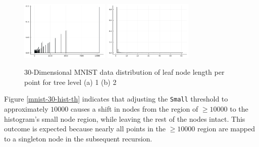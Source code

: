 \documentclass{juliacon}
\begin{document}
\begin{figure}[!ht]
  \centerline{
    \includegraphics[width=10pc]{figures/experiments/mnist_30/hist_1.png}
    \includegraphics[width=10pc]{figures/experiments/mnist_30/hist_2.png}
  }

  \caption{
    30-Dimensional MNIST data distribution of leaf node length per point for
    tree level (a) 1 (b) 2
  }
  \label{mnist-30-hist}
\end{figure}

Figure \ref{mnist-30-hist-th} indicates that adjusting the \verb|Small|
threshold to approximately $10000$ causes a shift in nodes from the region of
$\geq 10000$ to the histogram's small node region, while leaving the rest of
the nodes intact. This outcome is expected because nearly all points in the
$\geq 10000$ region are mapped to a singleton node in the subsequent recursion.
\end{document}
